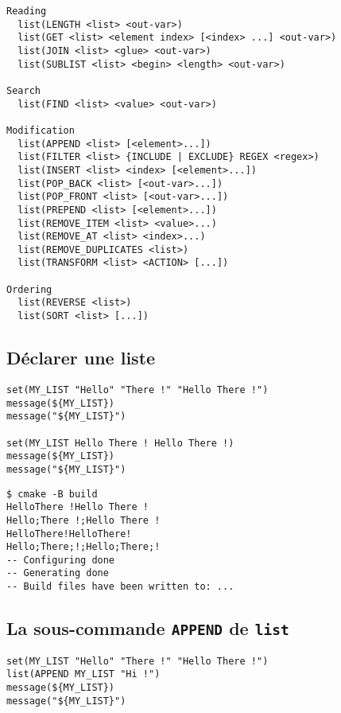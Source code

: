 \documentclass{beamer}
\newenvironment{Frame}{\begin{frame}[containsverbatim]{\subsecname}}{\end{frame}}
\begin{document}
\begin{Frame}
    \tiny
    \begin{verbatim}
Reading
  list(LENGTH <list> <out-var>)
  list(GET <list> <element index> [<index> ...] <out-var>)
  list(JOIN <list> <glue> <out-var>)
  list(SUBLIST <list> <begin> <length> <out-var>)

Search
  list(FIND <list> <value> <out-var>)

Modification
  list(APPEND <list> [<element>...])
  list(FILTER <list> {INCLUDE | EXCLUDE} REGEX <regex>)
  list(INSERT <list> <index> [<element>...])
  list(POP_BACK <list> [<out-var>...])
  list(POP_FRONT <list> [<out-var>...])
  list(PREPEND <list> [<element>...])
  list(REMOVE_ITEM <list> <value>...)
  list(REMOVE_AT <list> <index>...)
  list(REMOVE_DUPLICATES <list>)
  list(TRANSFORM <list> <ACTION> [...])

Ordering
  list(REVERSE <list>)
  list(SORT <list> [...])
    \end{verbatim}
\end{Frame}

\subsection{Déclarer une liste}

\begin{Frame}
    \begin{verbatim}
set(MY_LIST "Hello" "There !" "Hello There !")
message(${MY_LIST})
message("${MY_LIST}")

set(MY_LIST Hello There ! Hello There !)
message(${MY_LIST})
message("${MY_LIST}")
    \end{verbatim}
\end{Frame}

\begin{Frame}
    \begin{verbatim}
$ cmake -B build
HelloThere !Hello There !
Hello;There !;Hello There !
HelloThere!HelloThere!
Hello;There;!;Hello;There;!
-- Configuring done
-- Generating done
-- Build files have been written to: ...
    \end{verbatim}
\end{Frame}

\subsection{La sous-commande \texttt{APPEND} de \texttt{list}}

\begin{Frame}
    \begin{verbatim}
set(MY_LIST "Hello" "There !" "Hello There !")
list(APPEND MY_LIST "Hi !")
message(${MY_LIST})
message("${MY_LIST}")
    \end{verbatim}
\end{Frame}
\end{document}
